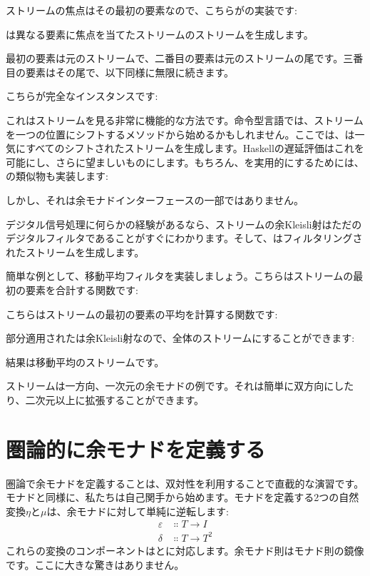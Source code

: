 ストリームの焦点はその最初の要素なので、こちらがの実装です: 

は異なる要素に焦点を当てたストリームのストリームを生成します。

最初の要素は元のストリームで、二番目の要素は元のストリームの尾です。三番目の要素はその尾で、以下同様に無限に続きます。

こちらが完全なインスタンスです: 

これはストリームを見る非常に機能的な方法です。命令型言語では、ストリームを一つの位置にシフトするメソッドから始めるかもしれません。ここでは、は一気にすべてのシフトされたストリームを生成します。Haskellの遅延評価はこれを可能にし、さらに望ましいものにします。もちろん、を実用的にするためには、の類似物も実装します: 

しかし、それは余モナドインターフェースの一部ではありません。

デジタル信号処理に何らかの経験があるなら、ストリームの余Kleisli射はただのデジタルフィルタであることがすぐにわかります。そして、はフィルタリングされたストリームを生成します。

簡単な例として、移動平均フィルタを実装しましょう。こちらはストリームの最初の要素を合計する関数です: 

こちらはストリームの最初の要素の平均を計算する関数です: 

部分適用されたは余Kleisli射なので、全体のストリームにすることができます: 

結果は移動平均のストリームです。

ストリームは一方向、一次元の余モナドの例です。それは簡単に双方向にしたり、二次元以上に拡張することができます。

\section{圏論的に余モナドを定義する}

圏論で余モナドを定義することは、双対性を利用することで直截的な演習です。モナドと同様に、私たちは自己関手から始めます。モナドを定義する2つの自然変換$\eta$と$\mu$は、余モナドに対して単純に逆転します: 
\begin{align*}
  \varepsilon & \Colon T \to I   \\
  \delta      & \Colon T \to T^2
\end{align*}
これらの変換のコンポーネントはとに対応します。余モナド則はモナド則の鏡像です。ここに大きな驚きはありません。

